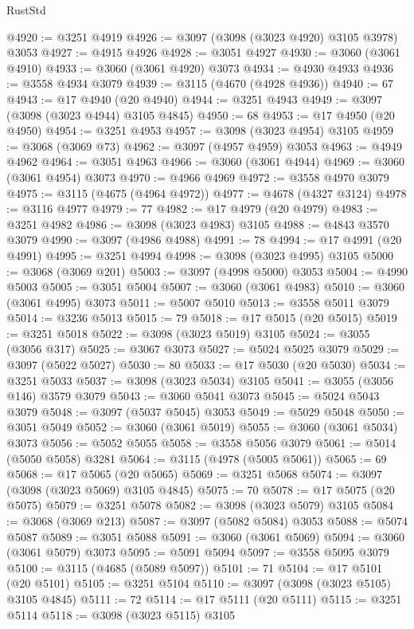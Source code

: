 \begin{lexlean}{RustStd}
\begin{coremodule}
{\begin{coremodule}
{{{{{{{{{{{{{{{{{{{{{{{{{{{{{{{{@4920 := @3251 @4919
@4926 := @3097 (@3098 (@3023 @4920) @3105 @3978) @3053
@4927 := @4915 @4926
@4928 := @3051 @4927
@4930 := @3060 (@3061 @4910)
@4933 := @3060 (@3061 @4920) @3073
@4934 := @4930 @4933
@4936 := @3558 @4934 @3079
@4939 := @3115 (@4670 (@4928 @4936))
@4940 := 67
@4943 := @17 @4940 (@20 @4940)
@4944 := @3251 @4943
@4949 := @3097 (@3098 (@3023 @4944) @3105 @4845)
@4950 := 68
@4953 := @17 @4950 (@20 @4950)
@4954 := @3251 @4953
@4957 := @3098 (@3023 @4954) @3105
@4959 := @3068 (@3069 @73)
@4962 := @3097 (@4957 @4959) @3053
@4963 := @4949 @4962
@4964 := @3051 @4963
@4966 := @3060 (@3061 @4944)
@4969 := @3060 (@3061 @4954) @3073
@4970 := @4966 @4969
@4972 := @3558 @4970 @3079
@4975 := @3115 (@4675 (@4964 @4972))
@4977 := @4678 (@4327 @3124)
@4978 := @3116 @4977
@4979 := 77
@4982 := @17 @4979 (@20 @4979)
@4983 := @3251 @4982
@4986 := @3098 (@3023 @4983) @3105
@4988 := @4843 @3570 @3079
@4990 := @3097 (@4986 @4988)
@4991 := 78
@4994 := @17 @4991 (@20 @4991)
@4995 := @3251 @4994
@4998 := @3098 (@3023 @4995) @3105
@5000 := @3068 (@3069 @201)
@5003 := @3097 (@4998 @5000) @3053
@5004 := @4990 @5003
@5005 := @3051 @5004
@5007 := @3060 (@3061 @4983)
@5010 := @3060 (@3061 @4995) @3073
@5011 := @5007 @5010
@5013 := @3558 @5011 @3079
@5014 := @3236 @5013
@5015 := 79
@5018 := @17 @5015 (@20 @5015)
@5019 := @3251 @5018
@5022 := @3098 (@3023 @5019) @3105
@5024 := @3055 (@3056 @317)
@5025 := @3067 @3073
@5027 := @5024 @5025 @3079
@5029 := @3097 (@5022 @5027)
@5030 := 80
@5033 := @17 @5030 (@20 @5030)
@5034 := @3251 @5033
@5037 := @3098 (@3023 @5034) @3105
@5041 := @3055 (@3056 @146) @3579 @3079
@5043 := @3060 @5041 @3073
@5045 := @5024 @5043 @3079
@5048 := @3097 (@5037 @5045) @3053
@5049 := @5029 @5048
@5050 := @3051 @5049
@5052 := @3060 (@3061 @5019)
@5055 := @3060 (@3061 @5034) @3073
@5056 := @5052 @5055
@5058 := @3558 @5056 @3079
@5061 := @5014 (@5050 @5058) @3281
@5064 := @3115 (@4978 (@5005 @5061))
@5065 := 69
@5068 := @17 @5065 (@20 @5065)
@5069 := @3251 @5068
@5074 := @3097 (@3098 (@3023 @5069) @3105 @4845)
@5075 := 70
@5078 := @17 @5075 (@20 @5075)
@5079 := @3251 @5078
@5082 := @3098 (@3023 @5079) @3105
@5084 := @3068 (@3069 @213)
@5087 := @3097 (@5082 @5084) @3053
@5088 := @5074 @5087
@5089 := @3051 @5088
@5091 := @3060 (@3061 @5069)
@5094 := @3060 (@3061 @5079) @3073
@5095 := @5091 @5094
@5097 := @3558 @5095 @3079
@5100 := @3115 (@4685 (@5089 @5097))
@5101 := 71
@5104 := @17 @5101 (@20 @5101)
@5105 := @3251 @5104
@5110 := @3097 (@3098 (@3023 @5105) @3105 @4845)
@5111 := 72
@5114 := @17 @5111 (@20 @5111)
@5115 := @3251 @5114
@5118 := @3098 (@3023 @5115) @3105
}}}}}}}}}}}}}}}}}}}}}}}}}}}}}}}}
\end{coremodule}}
\end{coremodule}
\end{lexlean}
